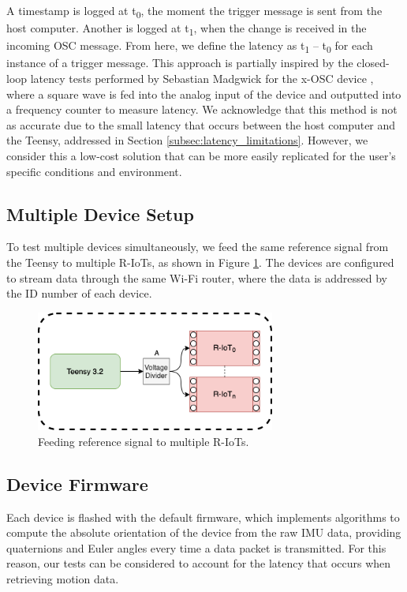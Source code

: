 A timestamp is logged at t\textsubscript{0}, the moment the trigger message is sent from the host computer. Another is logged at t\textsubscript{1}, when the change is received in the incoming OSC message. From here, we define the latency as t\textsubscript{1} – t\textsubscript{0} for each instance of a trigger message. This approach is partially inspired by the closed-loop latency tests performed by Sebastian Madgwick for the x-OSC device \cite{madgwick_x-osc_2013}, where a square wave is fed into the analog input of the device and outputted into a frequency counter to measure latency. We acknowledge that this method is not as accurate due to the small latency that occurs between the host computer and the Teensy, addressed in Section \ref{subsec:latency_limitations}. However, we consider this a low-cost solution that can be more easily replicated for the user’s specific conditions and environment.

\subsection*{Multiple Device Setup}
To test multiple devices simultaneously, we feed the same reference signal from the Teensy to multiple R-IoTs, as shown in Figure \ref{fig:latency_fig2}. The devices are configured to stream data through the same Wi-Fi router, where the data is addressed by the ID number of each device.

\begin{figure}[htbp]
  \centering
    \includegraphics[width=0.7\textwidth]{Chapters/Figures/technical/Latency/figure2.png}
    \caption{Feeding reference signal to multiple R-IoTs.}
    \label{fig:latency_fig2}
\end{figure}

\subsection*{Device Firmware}
Each device is flashed with the default firmware, which implements algorithms to compute the absolute orientation of the device from the raw IMU data, providing quaternions and Euler angles every time a data packet is transmitted. For this reason, our tests can be considered to account for the latency that occurs when retrieving motion data.

